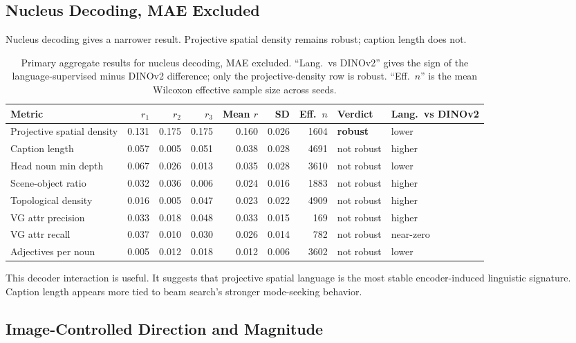 \documentclass[11pt]{article}
\newcommand{\robust}{\textcolor{green!45!black}{\textbf{robust}}}
\newcommand{\notrobust}{\textcolor{gray!70!black}{not robust}}
\begin{document}
\subsection{Nucleus Decoding, MAE Excluded}

Nucleus decoding gives a narrower result. Projective spatial density remains
robust; caption length does not.

\begin{table}[!htbp]
\centering
\caption{Primary aggregate results for nucleus decoding, MAE excluded.
``Lang.\ vs DINOv2'' gives the sign of the language-supervised minus DINOv2
difference; only the projective-density row is robust. ``Eff.\ \(n\)'' is the
mean Wilcoxon effective sample size across seeds.}
\label{tab:nucleus-primary}
\footnotesize
\begin{tabular}{@{}lrrrrrrll@{}}
\toprule
Metric & \(r_1\) & \(r_2\) & \(r_3\) & Mean \(r\) & SD & Eff.\ \(n\) & Verdict & Lang.\ vs DINOv2 \\
\midrule
Projective spatial density & 0.131 & 0.175 & 0.175 & 0.160 & 0.026 & 1604 & \robust & lower \\
Caption length & 0.057 & 0.005 & 0.051 & 0.038 & 0.028 & 4691 & \notrobust & higher \\
Head noun min depth & 0.067 & 0.026 & 0.013 & 0.035 & 0.028 & 3610 & \notrobust & lower \\
Scene-object ratio & 0.032 & 0.036 & 0.006 & 0.024 & 0.016 & 1883 & \notrobust & higher \\
Topological density & 0.016 & 0.005 & 0.047 & 0.023 & 0.022 & 4909 & \notrobust & higher \\
VG attr precision & 0.033 & 0.018 & 0.048 & 0.033 & 0.015 & 169 & \notrobust & higher \\
VG attr recall & 0.037 & 0.010 & 0.030 & 0.026 & 0.014 & 782 & \notrobust & near-zero \\
Adjectives per noun & 0.005 & 0.012 & 0.018 & 0.012 & 0.006 & 3602 & \notrobust & lower \\
\bottomrule
\end{tabular}
\end{table}

This decoder interaction is useful. It suggests that projective spatial
language is the most stable encoder-induced linguistic signature. Caption
length appears more tied to beam search's stronger mode-seeking behavior.

\subsection{Image-Controlled Direction and Magnitude}
\end{document}
